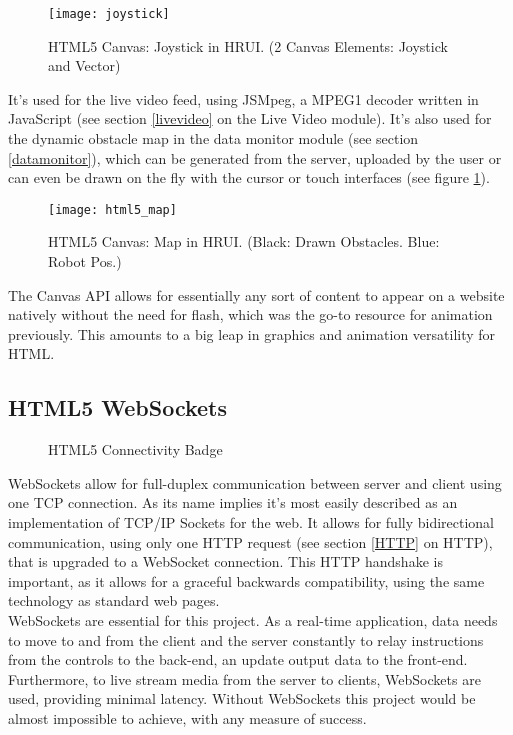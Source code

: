 \begin{figure}[h]
\begin{center}
  \texttt{[image: joystick]}
  \end{center}
  \caption{HTML5 Canvas: Joystick in HRUI. (2 Canvas Elements: Joystick and Vector)}
\end{figure}
It's used for the live video feed, using JSMpeg, a MPEG1 decoder written in JavaScript (see section \ref{livevideo} on the
Live Video module). It's also used for the dynamic obstacle map in the data monitor module (see section \ref{datamonitor}),
which can be generated from the server, uploaded by the user or can even be drawn on the fly with the cursor or touch
interfaces (see figure \ref{html5_map}).\\

\begin{figure}[h]
\begin{center}
  \texttt{[image: html5\_map]}
  \end{center}
  \caption{HTML5 Canvas: Map in HRUI. (Black: Drawn Obstacles. Blue: Robot Pos.)\label{html5_map}}
\end{figure}
The Canvas API allows for essentially any sort of content to appear on a website natively without the need for flash, which
was the go-to resource for animation previously. This amounts to a big leap in graphics and animation versatility for HTML.\\

\subsection{HTML5 WebSockets}
\begin{figure}[h]
\centering

\caption{HTML5 Connectivity Badge}
\end{figure}
WebSockets allow for full-duplex communication between server and client using one TCP connection. As its name implies it's
most easily described as an implementation of TCP/IP Sockets for the web. It allows for fully bidirectional communication,
using only one HTTP request (see section \ref{HTTP} on HTTP), that is upgraded to a WebSocket connection. This HTTP handshake
is important, as it allows for a graceful backwards compatibility, using the same technology as standard web pages.\\

WebSockets are essential for this project. As a real-time application, data needs to move to and from the client and the
server constantly to relay instructions from the controls to the back-end, an update output data to the front-end.
Furthermore, to live stream media from the server to clients, WebSockets are used, providing minimal latency. Without
WebSockets this project would be almost impossible to achieve, with any measure of success.\\

